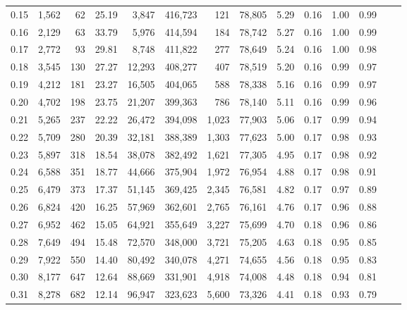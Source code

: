 \begin{tabular}{rrrrrrrrrrrrrr}
0.15 &   1,562 &     62 &   25.19 &    3,847 &  416,723 &     121 &  78,805 &  5.29 &  0.16 &  1.00 &      0.99 \\
0.16 &   2,129 &     63 &   33.79 &    5,976 &  414,594 &     184 &  78,742 &  5.27 &  0.16 &  1.00 &      0.99 \\
0.17 &   2,772 &     93 &   29.81 &    8,748 &  411,822 &     277 &  78,649 &  5.24 &  0.16 &  1.00 &      0.98 \\
0.18 &   3,545 &    130 &   27.27 &   12,293 &  408,277 &     407 &  78,519 &  5.20 &  0.16 &  0.99 &      0.97 \\
0.19 &   4,212 &    181 &   23.27 &   16,505 &  404,065 &     588 &  78,338 &  5.16 &  0.16 &  0.99 &      0.97 \\
0.20 &   4,702 &    198 &   23.75 &   21,207 &  399,363 &     786 &  78,140 &  5.11 &  0.16 &  0.99 &      0.96 \\
0.21 &   5,265 &    237 &   22.22 &   26,472 &  394,098 &   1,023 &  77,903 &  5.06 &  0.17 &  0.99 &      0.94 \\
0.22 &   5,709 &    280 &   20.39 &   32,181 &  388,389 &   1,303 &  77,623 &  5.00 &  0.17 &  0.98 &      0.93 \\
0.23 &   5,897 &    318 &   18.54 &   38,078 &  382,492 &   1,621 &  77,305 &  4.95 &  0.17 &  0.98 &      0.92 \\
0.24 &   6,588 &    351 &   18.77 &   44,666 &  375,904 &   1,972 &  76,954 &  4.88 &  0.17 &  0.98 &      0.91 \\
0.25 &   6,479 &    373 &   17.37 &   51,145 &  369,425 &   2,345 &  76,581 &  4.82 &  0.17 &  0.97 &      0.89 \\
0.26 &   6,824 &    420 &   16.25 &   57,969 &  362,601 &   2,765 &  76,161 &  4.76 &  0.17 &  0.96 &      0.88 \\
0.27 &   6,952 &    462 &   15.05 &   64,921 &  355,649 &   3,227 &  75,699 &  4.70 &  0.18 &  0.96 &      0.86 \\
0.28 &   7,649 &    494 &   15.48 &   72,570 &  348,000 &   3,721 &  75,205 &  4.63 &  0.18 &  0.95 &      0.85 \\
0.29 &   7,922 &    550 &   14.40 &   80,492 &  340,078 &   4,271 &  74,655 &  4.56 &  0.18 &  0.95 &      0.83 \\
0.30 &   8,177 &    647 &   12.64 &   88,669 &  331,901 &   4,918 &  74,008 &  4.48 &  0.18 &  0.94 &      0.81 \\
0.31 &   8,278 &    682 &   12.14 &   96,947 &  323,623 &   5,600 &  73,326 &  4.41 &  0.18 &  0.93 &      0.79 \\

\end{tabular}

